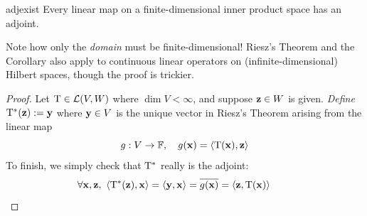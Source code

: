 \begin{cor}{}{adjexist}
	Every linear map on a finite-dimensional inner product space has an adjoint.
\end{cor}



Note how only the \emph{domain} must be finite-dimensional! Riesz's Theorem and the Corollary also apply to continuous linear operators on (infinite-dimensional) Hilbert spaces, though the proof is trickier.


\begin{proof}
	Let $\mathrm{T}\in\mathcal{L}(V,W)$ where $\dim V<\infty$, and suppose ${\mathbf{z}}\in W$ is given. \emph{Define} $\mathrm{T}^*({\mathbf{z}}):={\mathbf{y}}$ where ${\mathbf{y}}\in V$ is the unique vector in Riesz's Theorem arising from the linear map
	\[
		g:V\to\mathbb{F},\quad g({\mathbf{x}})=\left\langle \mathrm{T}({\mathbf{x}}),{\mathbf{z}}\right\rangle
	\]
	To finish, we simply check that $\mathrm{T}^*$ really is the adjoint:
	\[
		\forall\vx,\vz,\ \ip{\rT^*(\vz),\vx}=\ip{\vy,\vx}=\cl{g(\vx)} =\ip{\vz,\rT(\vx)}\tag*{\qedhere}
	\]
	\vspace{-10pt}
\end{proof}


\vfil


